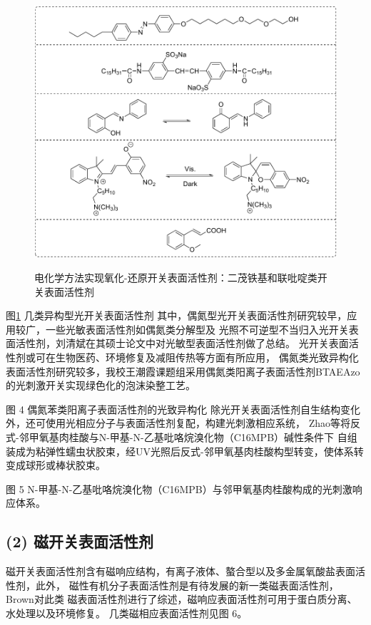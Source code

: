 \documentclass[bachelor,fandolfonts,replaceperiod]{jnuthesis} %
\begin{document}
    \begin{figure}[htbp]
        \centering
        \includegraphics[width= \textwidth]{Figure/switchable-light.pdf}\\
        \caption{电化学方法实现氧化-还原开关表面活性剂：二茂铁基和联吡啶类开关表面活性剂}\label{fig:switchable-light}
    \end{figure}
    
    图\ref{fig:switchable-light} 几类异构型光开关表面活性剂\cite{张冤帝2017,karthaus1996,shang2003,吕湘亮2018}
    其中，偶氮型光开关表面活性剂研究较早，应用较广，一些光敏表面活性剂如偶氮类分解型及
    光照不可逆型不当归入光开关表面活性剂，刘清斌在其硕士论文中对光敏型表面活性剂做了总结\cite{刘清斌2018}。
    光开关表面活性剂或可在生物医药、环境修复及减阻传热等方面有所应用\cite{刘清斌2018}，
    偶氮类光致异构化表面活性剂研究较多，我校王潮霞课题组\cite{chen2016}采用偶氮类阳离子表面活性剂BTAEAzo的光刺激开关实现绿色化的泡沫染整工艺。
    
    图 4 偶氮苯类阳离子表面活性剂的光致异构化\cite{chen2016}
    除光开关表面活性剂自生结构变化外，还可使用光相应分子与表面活性剂复配，构建光刺激相应系统，
    Zhao等\cite{zhao2016}将反式-邻甲氧基肉桂酸与N-甲基-N-乙基吡咯烷溴化物（C16MPB）碱性条件下
    自组装成为粘弹性蠕虫状胶束，经UV光照后反式-邻甲氧基肉桂酸构型转变，使体系转变成球形或棒状胶束。
    
    图 5 N-甲基-N-乙基吡咯烷溴化物（C16MPB）与邻甲氧基肉桂酸构成的光刺激响应体系\cite{zhao2016}。
    
    \subsection*{(2) 磁开关表面活性剂}
    磁开关表面活性剂含有磁响应结构，有离子液体、螯合型以及多金属氧酸盐表面活性剂，此外，
    磁性有机分子表面活性剂是有待发展的新一类磁表面活性剂\cite{brown2015}，Brown\cite{brown2015}对此类
    磁表面活性剂进行了综述，磁响应表面活性剂可用于蛋白质分离、水处理以及环境修复\cite{brown2015}。
    几类磁相应表面活性剂见图 6。
    
\end{document}
